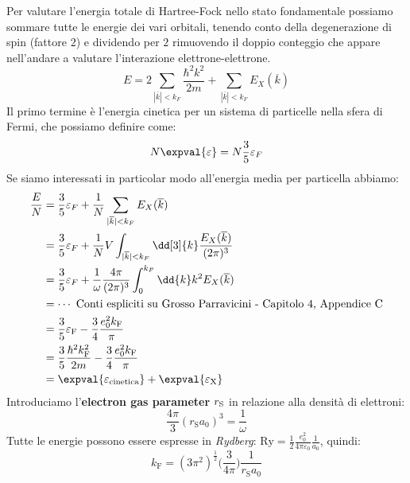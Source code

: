 Per valutare l'energia totale di Hartree-Fock nello stato fondamentale possiamo sommare tutte le energie dei vari orbitali, tenendo conto della degenerazione di spin (fattore $2$) e dividendo per $2$ rimuovendo il doppio conteggio che appare nell'andare a valutare l'interazione elettrone-elettrone.
\begin{equation*}
    E= 2 \sum_{|\overline k|<k_F} \frac{\hbar^2k^2}{2m} + \sum_{|\overline k|<k_F}E_X(\overline k)
\end{equation*}
Il primo termine è l'energia cinetica per un sistema di particelle nella sfera di Fermi, che possiamo definire come:
\begin{equation*}
    N\expval{\varepsilon}=N\frac 35 \varepsilon_F
\end{equation*}
Se siamo interessati in particolar modo all'energia media per particella abbiamo:
\begin{equation*}
    \begin{aligned}
        \frac E N &= \frac 35\varepsilon_F+\frac 1N \sum_{|\overline k|<k_F}E_X(\overline k) \\
        & = \frac 35\varepsilon_F+\frac 1N V \int_{|\overline k|<k_F}\dd[3]{k}\frac{E_X(\overline k)}{(2\pi)^3}\\
        & = \frac 35\varepsilon_F+\frac 1\omega \frac{4\pi}{(2\pi)^3}\int_0^{k_F}\dd{k}k^2E_X(\overline k)\\
        & = \cdots \text{ Conti espliciti su Grosso Parravicini - Capitolo 4, Appendice C}\\
        & = \frac 35 \varepsilon_\text{F}- \frac 34\frac{e_0^2k_\text{F}}{\pi} \\
        & = \frac 35 \frac{\hbar^2k_\text{F}^2}{2m}- \frac 34\frac{e_0^2k_\text{F}}{\pi} \\
        & = \expval{\varepsilon_{\text{cinetica}}}+\expval{\varepsilon_{\text{X}}}
    \end{aligned}
\end{equation*}
Introduciamo l'\textbf{electron gas parameter} $r_\text S$ in relazione alla densità di elettroni:
\begin{equation*}
    \frac{4\pi}{3}(r_\text{S}a_0)^3=\frac 1 \omega
\end{equation*}
Tutte le energie possono essere espresse in \textit{Rydberg}: $\text{Ry}=\frac 12 \frac{e_0^2}{4\pi\varepsilon_0}\frac{1}{a_0}$, quindi:
\begin{equation*}
    k_\text{F}=(3\pi^2)^{\frac{1}{2}}\bigg(\frac{3}{4\pi}\bigg)\frac{1}{r_\text{S}a_0}
\end{equation*}
